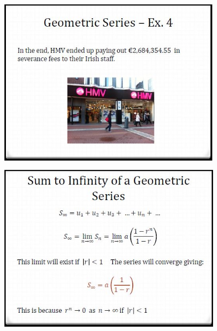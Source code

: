 \documentclass{beamer}
\begin{document}
\begin{frame}
	\begin{figure}
		\centering
		\includegraphics[width=0.99\linewidth]{SeqSer21C}
	\end{figure}
	
\end{frame}	
\begin{frame}
	\begin{figure}
		\centering
		\includegraphics[width=0.99\linewidth]{SeqSer21D}
	\end{figure}
	
\end{frame}
\end{document}
